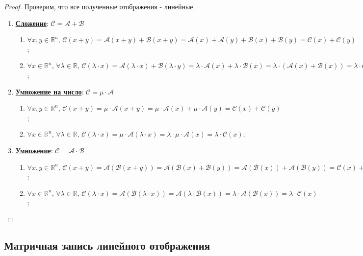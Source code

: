 \documentclass[12pt]{article}
\newcommand{\MR}{\mathbb{R}}
\newcommand{\MA}{\mathcal{A}}
\newcommand{\MCB}{\mathcal{B}}
\newcommand{\MCC}{\mathcal{C}}
\newcommand{\MB}{\mathcal{B}}
\theoremstyle{definition}
\begin{document}
\begin{proof}
	Проверим, что все полученные отображения - линейные.
	\begin{enumerate}[label=(\arabic*)]
		\item \uline{\textbf{Сложение}}: $\MCC = \MA + \MCB$
			\begin{enumerate}[label=\arabic*)]
				\item $\forall x,y \in \MR^n, \, \MCC(x + y) = \MA(x+y) + \MCB(x+y) = \MA(x) + \MA(y) + \MCB(x) + \MCB(y) = \MCC(x) + \MCC(y)$;
				\item $\forall x \in \MR^n, \, \forall \lambda \in \MR, \, \MCC(\lambda{\cdot}x) = \MA(\lambda{\cdot}x) + \MCB(\lambda{\cdot}y) = \lambda{\cdot}\MA(x) + \lambda{\cdot}\MCB(x) = \lambda{\cdot}(\MA(x)+ \MCB(x)) = \lambda{\cdot}\MCC(x)$;
			\end{enumerate}
		\item \uline{\textbf{Умножение на число}}: $\MCC = \mu{\cdot}\MA$
			\begin{enumerate}[label=\arabic*)]
				\item $\forall x,y \in \MR^n, \, \MCC(x + y) = \mu{\cdot}\MA(x +y) = \mu{\cdot}\MA(x) + \mu{\cdot}\MA(y) = \MCC(x) + \MCC(y)$;
				\item $\forall x \in \MR^n, \, \forall \lambda \in \MR, \, \MCC(\lambda{\cdot}x) = \mu{\cdot}\MA(\lambda{\cdot}x) = \lambda{\cdot}\mu{\cdot} \MA(x) = \lambda{\cdot}\MCC(x)$;
			\end{enumerate}
		\item \uline{\textbf{Умножение}}: $\MCC = \MA{\cdot}\MCB$
		\begin{enumerate}[label=\arabic*)]
			\item $\forall x,y \in \MR^n, \, \MCC(x + y) = \MA(\MB(x+y)) = \MA(\MB(x) + \MB(y)) =\MA(\MCB(x)) + \MA(\MCB(y)) = \MCC(x) + \MCC(y)$;
			\item $\forall x \in \MR^n, \, \forall \lambda \in \MR, \, \MCC(\lambda{\cdot}x) = \MA(\MCB(\lambda{\cdot}x)) = \MA(\lambda{\cdot}\MCB(x)) = \lambda{\cdot}\MA(\MB(x)) = \lambda{\cdot}\MCC(x)$;
		\end{enumerate}
	\end{enumerate}
\end{proof}

\subsection*{Матричная запись линейного отображения}
\end{document}
